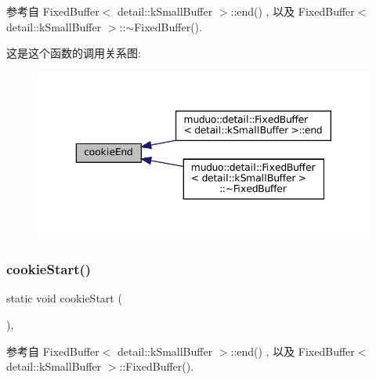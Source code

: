 参考自 Fixed\+Buffer$<$ detail\+::k\+Small\+Buffer $>$\+::end() , 以及 Fixed\+Buffer$<$ detail\+::k\+Small\+Buffer $>$\+::$\sim$\+Fixed\+Buffer().

这是这个函数的调用关系图\+:
\nopagebreak
\begin{figure}[H]
\begin{center}
\leavevmode
\includegraphics[width=343pt]{classmuduo_1_1detail_1_1FixedBuffer_a6340e2e9c0b269ff97b1ffa43dfb2920_icgraph}
\end{center}
\end{figure}
\mbox{\label{classmuduo_1_1detail_1_1FixedBuffer_a64d4d2d5b107798f469956cd12405b84}} 
\subsubsection{\texorpdfstring{cookie\+Start()}{cookieStart()}}
{\footnotesize\ttfamily static void cookie\+Start (\begin{DoxyParamCaption}{ }\end{DoxyParamCaption})\hspace{0.3cm}{\ttfamily [static]}, {\ttfamily [private]}}



参考自 Fixed\+Buffer$<$ detail\+::k\+Small\+Buffer $>$\+::end() , 以及 Fixed\+Buffer$<$ detail\+::k\+Small\+Buffer $>$\+::\+Fixed\+Buffer().

